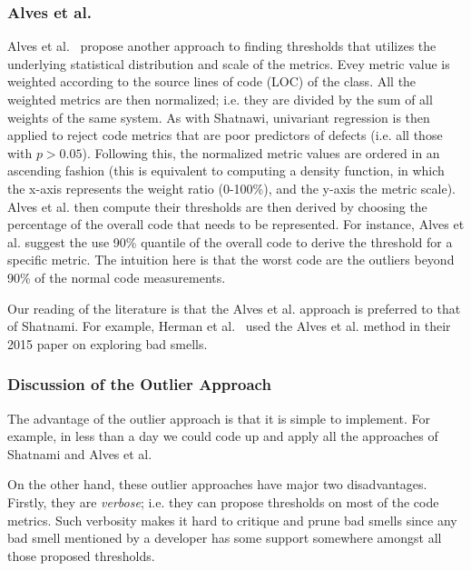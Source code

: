 \documentclass{sig-alternate}
\begin{document}
\subsubsection{ Alves et al.}
Alves et al.~\cite{Alves2010} propose another approach
to finding thresholds that  utilizes the underlying statistical distribution and scale of the metrics. 
Evey metric value is weighted according to the source lines of code (LOC) of the class. All the weighted metrics are then normalized; i.e. they are divided by the sum of all weights of the same system. As with Shatnawi, univariant regression
is then applied to reject code metrics that are poor predictors of defects (i.e. all those  with $p > 0.05$).
Following this, the normalized metric values are ordered in an ascending fashion (this is equivalent to computing a density function, in which the x-axis represents the weight ratio (0-100\%), and the y-axis the metric scale).
Alves et al. then compute their 
thresholds are then derived by choosing the percentage of the overall code that needs to be represented. For instance, Alves et al. suggest the use 90\% quantile of the overall code to derive the threshold for a specific metric. The intuition here is that the worst
code are the outliers beyond 90\% of the normal code measurements.

Our reading of the literature is that the Alves et al.  
approach is preferred to that of Shatnami. For example, Herman et al.~\cite{hermans15} used the
Alves et al. method in their  2015 paper on
exploring bad smells.

\subsubsection{Discussion of the Outlier Approach}
The advantage of the outlier
approach is that it is simple to implement. 
For example, in less than a day we could
code up and apply all the approaches of Shatnami and 
Alves et al.

On the other hand, these outlier approaches have major two disadvantages. 
Firstly, they are {\em verbose}; i.e.  they can
propose thresholds on most of the code metrics.
Such verbosity makes it hard   to critique and prune bad smells
since any bad smell mentioned by a developer has some support
somewhere amongst all those proposed thresholds.
\end{document}
